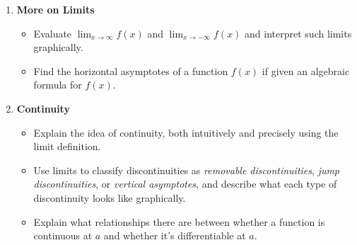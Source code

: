 \documentclass{article}
\begin{document}
\begin{enumerate}
\begin{itemize}
  \item Recognize when we need to factor and cancel to calculate a limit (for example, with $\displaystyle \lim_{x \to 2} \frac{x^2 - 4}{x - 2}$).

  \item Explain precisely what we mean when we write $\displaystyle \lim_{x \to a} f(x) = \infty$ or $\displaystyle \lim_{x \to a} f(x) = -\infty$. In particular, you should understand that, in both of these cases, $\displaystyle \lim_{x \to a} f(x)$ does not exist, but that saying $\displaystyle \lim_{x \to a} f(x) = \infty$ or $\displaystyle \lim_{x \to a} f(x) = -\infty$ gives more information than just saying ``$\displaystyle \lim_{x \to a} f(x)$ does not exist'' does.

  \item Use algebraic methods to determine whether a limit is $\pm \infty$.

  \end{itemize}

\item \textbf{More on Limits} %
  \begin{itemize}
  \item Evaluate $\displaystyle \lim_{x \to \infty} f(x)$ and $\displaystyle \lim_{x \to -\infty} f(x)$ and interpret such limits graphically.

  \item Find the horizontal asymptotes of a function $f(x)$ if given an algebraic formula for $f(x)$. 
  \end{itemize}
  

    \addtocounter{enumi}{1}

\item \textbf{Continuity} %
  \begin{itemize}
  \item Explain the idea of continuity, both intuitively and precisely using the limit definition.

  \item Use limits to classify discontinuities as \emph{removable discontinuities}, \emph{jump discontinuities}, or \emph{vertical asymptotes}, and describe what each type of discontinuity looks like graphically.

  \item Explain what relationships there are between whether a function is continuous at $a$ and whether it's differentiable at $a$.


\end{itemize}
\end{enumerate}
\end{document}
